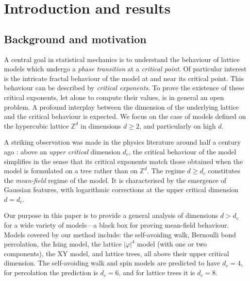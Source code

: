 \documentclass[11pt,a4paper]{article}
\numberwithin{equation}{section}
\theoremstyle{plain}
\theoremstyle{definition}
\newcommand\1{\mathds{1}}
\begin{document}
\tableofcontents



\section{Introduction and results}

\subsection{Background and motivation}
\label{sec:motivation}

A central goal in statistical mechanics is to understand the
behaviour of lattice models which undergo a \emph{phase transition} at a \emph{critical point}. Of particular interest is
the intricate fractal behaviour of the model at and near its critical point.
This behaviour can be described by \emph{critical exponents}.
To prove the existence of these critical exponents, let alone to compute their values,
is in general an open problem.
A profound interplay between the dimension of the underlying lattice and the critical behaviour is expected.
We focus on the case of models defined on the
hypercubic lattice $\mathbb Z^d$ in dimensions $d\geq 2$, and particularly on high $d$.

A striking observation was made in the physics literature around half a century
ago \cite{Ginz61,WF72}: above an \emph{upper critical} dimension $d_c$, the critical behaviour of the model simplifies in the sense that its critical exponents match those obtained when the
model is formulated on a tree rather than on $\mathbb Z^d$. The regime $d\geq d_c$ constitutes the \emph{mean-field} regime of the model. It is characterised by the emergence of Gaussian features, with logarithmic corrections at the upper critical dimension $d=d_c$.

Our purpose in this paper is to provide a general analysis of dimensions $d>d_c$ for a
wide variety of models---a black box for proving mean-field behaviour.
Models covered by our method include:
the self-avoiding walk,
Bernoulli bond percolation,
the Ising model,
the lattice $|\varphi|^4$ model (with one or two components),
the XY model, and lattice trees, all above their upper critical dimension.
The self-avoiding walk and spin models are predicted to have $d_c=4$,
for percolation the prediction is $d_c=6$, and for lattice trees it is $d_c=8$.
\end{document}
